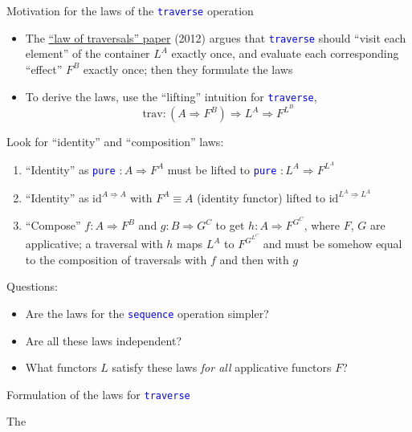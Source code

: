 \documentclass[english]{beamer}
\begin{document}
\begin{frame}{Motivation for the laws of the \texttt{\textcolor{blue}{\footnotesize{}traverse}}
operation }
\begin{itemize}
\item \vspace{-0.15cm}The \href{https://arxiv.org/pdf/1202.2919.pdf}{\textquotedblleft law of traversals\textquotedblright{} paper}
(2012) argues that \texttt{\textcolor{blue}{\footnotesize{}traverse}}
should ``visit each element'' of the container $L^{A}$ exactly
once, and evaluate each corresponding ``effect'' $F^{B}$ exactly
once; then they formulate the laws
\item To derive the laws, use the ``lifting'' intuition for \texttt{\textcolor{blue}{\footnotesize{}traverse}},{\footnotesize{}
\[
\text{trav}:(A\Rightarrow F^{B})\Rightarrow L^{A}\Rightarrow F^{L^{B}}
\]
}{\footnotesize \par}
\end{itemize}
{\footnotesize{}L}ook for ``identity'' and ``composition'' laws:
\begin{enumerate}
\item ``Identity'' as \texttt{\textcolor{blue}{\footnotesize{}pure}} $:A\Rightarrow F^{A}$
must be lifted to \texttt{\textcolor{blue}{\footnotesize{}pure}} $:L^{A}\Rightarrow F^{L^{A}}$
\item ``Identity'' as $\text{id}^{\underline{A\Rightarrow A}}$ with $F^{A}\equiv A$
(identity functor) lifted to $\text{id}^{\underline{L^{A}\Rightarrow L^{A}}}$
\item ``Compose'' $f:A\Rightarrow F^{B}$ and $g:B\Rightarrow G^{C}$
to get $h:A\Rightarrow F^{G^{C}}$, where $F$, $G$ are applicative;
a traversal with $h$ maps $L^{A}$ to $F^{G^{L^{C}}}$ and must be
somehow equal to the composition of traversals with $f$ and then
with $g$
\end{enumerate}
Questions:
\begin{itemize}
\item Are the laws for the \texttt{\textcolor{blue}{\footnotesize{}sequence}}
operation simpler?
\item Are all these laws independent?
\item What functors $L$ satisfy these laws \emph{for all} applicative functors
$F$?
\end{itemize}
\end{frame}

\begin{frame}{Formulation of the laws for \texttt{\textcolor{blue}{\footnotesize{}traverse}} }

\vspace{-0.15cm}The 
\end{frame}
\end{document}
